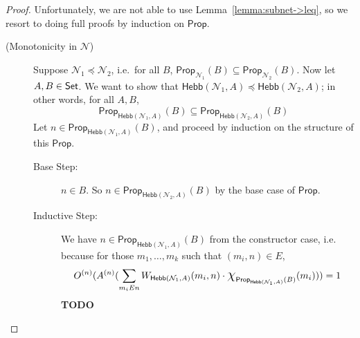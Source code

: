 \documentclass[letterpaper]{article}
\theoremstyle{definition}
\newcommand{\Set}{\mbox{\sf Set}}
\newcommand*{\bigchi}{\mbox{\Large$\chi$}}%
\newcommand{\Prop}{\textsf{Prop}}
\newcommand{\Inc}{\textsf{Hebb}}
\newcommand{\Net}{\mathcal{N}}
\begin{document}
\begin{proof} Unfortunately, we are not able to use Lemma~\ref{lemma:subnet->leq}, so we resort to doing full proofs by induction on $\Prop$.
\begin{description}
    \item[(Monotonicity in $\Net$)] 
    Suppose $\Net_1 \preceq \Net_2$, i.e.\ for all $B$, $\Prop_{\Net_1}(B) \subseteq \Prop_{\Net_2}(B)$. Now let $A, B \in \Set$. We want to show that $\Inc(\Net_1, A) \preceq \Inc(\Net_2, A)$; in other words, for all $A, B$,
    \[
        \Prop_{\Inc(\Net_1, A)}(B) \subseteq \Prop_{\Inc(\Net_2, A)}(B)
    \]
    Let $n \in \Prop_{\Inc(\Net_1, A)}(B)$, and proceed by induction on the structure of this $\Prop$.
    \begin{description}
        \item[Base Step:] $n \in B$. So $n \in \Prop_{\Inc(\Net_2, A)}(B)$ by the base case of $\Prop$.
        \item[Inductive Step:] We have $n \in \Prop_{\Inc(\Net_1, A)}(B)$ from the constructor case, i.e. because for those $m_1, \ldots, m_k$ such that $(m_i, n) \in E$,
        \[
            O^{(n)}(A^{(n)}(\sum_{m_i{E}n} W_{\Inc(\Net_1, A)}(m_i, n) \cdot \bigchi_{\Prop_{\Inc(\Net_1, A)}(B)}(m_i))) = 1
        \]
        \textbf{TODO}
    \end{description}
    


\end{description}
\end{proof}
\end{document}
